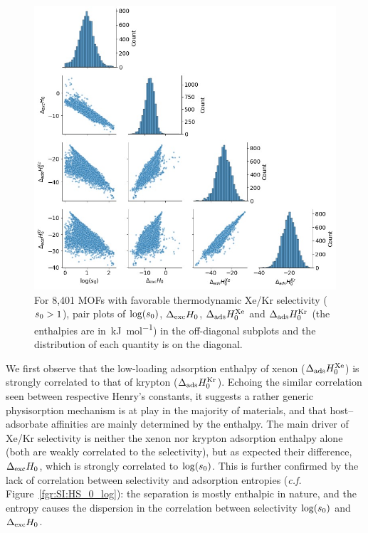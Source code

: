 \documentclass[main.tex]{subfiles}
\begin{document}
\begin{figure}[t]
\centering
  \includegraphics[width=0.7\linewidth]{figures/2-thermo/Enthalpy_0_log.jpg}
  \caption{For 8,401 MOFs with favorable thermodynamic Xe/Kr selectivity ($s_{\text{0}} > 1$), pair plots of $\log(s_{\text{0}})$, $\Delta_{\text{exc}}H_{\text{0}}$, $\Delta_{\text{ads}}H^{\text{Xe}}_{\text{0}}$ and $\Delta_{\text{ads}}H^{\text{Kr}}_{\text{0}}$ (the enthalpies are in~\si{\kilo\joule\per\mol}) in the off-diagonal subplots and the distribution of each quantity is on the diagonal.}
  \label{fgr:histo_H}
\end{figure}

We first observe that the low-loading adsorption enthalpy of xenon ($\Delta_{\text{ads}}H^{\text{Xe}}_{\text{0}}$) is strongly correlated to that of krypton ($\Delta_{\text{ads}}H^{\text{Kr}}_{\text{0}}$). Echoing the similar correlation seen between respective Henry's constants, it suggests a rather generic physisorption mechanism is at play in the majority of materials, and that host--adsorbate affinities are mainly determined by the enthalpy. The main driver of Xe/Kr selectivity is neither the xenon nor krypton adsorption enthalpy alone (both are weakly correlated to the selectivity), but as expected their difference, $\Delta_{\text{exc}}H_{\text{0}}$, which is strongly correlated to $\log(s_{\text{0}})$. This is further confirmed by the lack of correlation between selectivity and adsorption entropies (\emph{c.f.} Figure~\ref{fgr:SI:HS_0_log}): the separation is mostly enthalpic in nature, and the entropy causes the dispersion in the correlation between selectivity $\log(s_{\text{0}})$ and $\Delta_{\text{exc}}H_{\text{0}}$.
\end{document}
